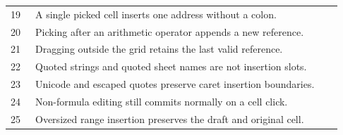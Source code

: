 \documentclass[11pt,letterpaper]{article}
\begin{document}
\begin{longtable}{@{}P{0.07\linewidth}P{0.87\linewidth}@{}}
19 & A single picked cell inserts one address without a colon.\\
20 & Picking after an arithmetic operator appends a new reference.\\
21 & Dragging outside the grid retains the last valid reference.\\
22 & Quoted strings and quoted sheet names are not insertion slots.\\
23 & Unicode and escaped quotes preserve caret insertion boundaries.\\
24 & Non-formula editing still commits normally on a cell click.\\
25 & Oversized range insertion preserves the draft and original cell.\\
\bottomrule\end{longtable}
\end{document}

